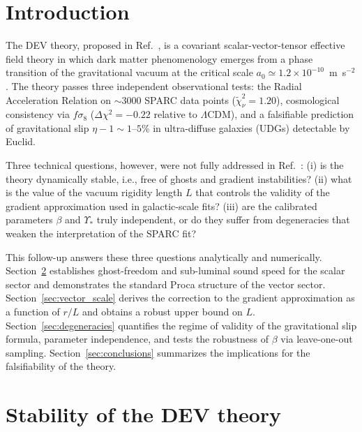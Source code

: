 \documentclass[aps,prd,reprint,floatfix,nofootinbib,superscriptaddress]{revtex4-2}
\newcommand{\aO}{a_0}
\begin{document}
\maketitle

\section{Introduction}

The DEV theory, proposed in Ref.~\cite{Mendes2026}, is a covariant
scalar-vector-tensor effective field theory in which dark matter
phenomenology emerges from a phase transition of the gravitational
vacuum at the critical scale $\aO\simeq 1.2\times10^{-10}$~m~s$^{-2}$.
The theory passes three independent observational tests:
the Radial Acceleration Relation on $\sim$3000 SPARC data points
($\widetilde{\chi}^2_\nu=1.20$), cosmological consistency via
$f\sigma_8$ ($\Delta\chi^2 = -0.22$ relative to $\Lambda$CDM), and a
falsifiable prediction of gravitational slip $\eta-1\sim 1\text{--}5\%$
in ultra-diffuse galaxies (UDGs) detectable by Euclid.

Three technical questions, however, were not fully addressed in
Ref.~\cite{Mendes2026}: (i) is the theory dynamically stable, i.e.,
free of ghosts and gradient instabilities? (ii) what is the value of
the vacuum rigidity length $L$ that controls the validity of the
gradient approximation used in galactic-scale fits? (iii) are the
calibrated parameters $\beta$ and $\Upsilon_*$ truly independent, or
do they suffer from degeneracies that weaken the interpretation of
the SPARC fit?

This follow-up answers these three questions analytically and
numerically. Section~\ref{sec:stability} establishes
ghost-freedom and sub-luminal sound speed for the scalar sector and
demonstrates the standard Proca structure of the vector sector.
Section~\ref{sec:vector_scale} derives the correction to the
gradient approximation as a function of $r/L$ and obtains a robust
upper bound on $L$. Section~\ref{sec:degeneracies} quantifies the
regime of validity of the gravitational slip formula, parameter
independence, and tests the robustness of $\beta$ via
leave-one-out sampling. Section~\ref{sec:conclusions} summarizes the
implications for the falsifiability of the theory.

\section{Stability of the DEV theory}
\label{sec:stability}
\end{document}
